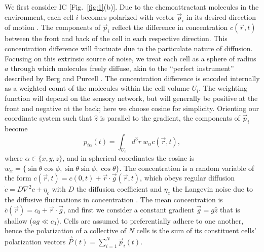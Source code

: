 We first consider IC [Fig.\ \ref{fig:1}(b)]. Due to the chemoattractant molecules in the environment, each cell $i$ becomes polarized with vector $\vec{p}_i$ in its desired direction of motion \cite{jilkine2011comparison}. The components of $\vec{p}_i$ reflect the difference in concentration $c(\vec{r},t)$ between the front and back of the cell in each respective direction. This concentration difference will fluctuate due to the particulate nature of diffusion. Focusing on this extrinsic source of noise, we treat each cell as a sphere of radius $a$ through which molecules freely diffuse, akin to the ``perfect instrument'' described by Berg and Purcell \cite{berg1977physics}.
The concentration difference is encoded internally as a weighted count of the molecules within the cell volume $U_i$. The weighting function will depend on the sensory network, but will generally be positive at the front and negative at the back; here we choose cosine for simplicity. Orienting our coordinate system such that $\hat{z}$ is parallel to the gradient, the components of $\vec{p}_i$ become
\begin{equation}
    p_{i\alpha}(t) = \int_{U_i} d^3r \ w_\alpha c(\vec{r},t) , \label{eq:ICcell}
\end{equation}
where $\alpha\in\{x,y,z\}$, and in spherical coordinates the cosine is $w_\alpha = \{\sin\theta \cos\phi, \sin\theta \sin\phi, \cos\theta\}$.
The concentration is a random variable of the form
$c(\vec{r},t) = c(0,t) + \vec{r}\cdot\vec{g}(\vec{r},t)$,
which obeys regular diffusion $\dot{c} = D\nabla^2c+\eta_c$ with $D$ the diffusion coefficient and $\eta_c$ the Langevin noise due to the diffusive fluctuations in concentration \cite{gardiner1985handbook,fancher2016fundamental}. The mean concentration is
$\bar{c}(\vec{r}) = c_0 + \vec{r}\cdot\vec{g}$,
and first we consider a constant gradient
$\vec{g} = g \hat{z}$ that is shallow ($ag \ll c_0$). Cells are assumed to preferentially adhere to one another, hence the polarization of a collective of $N$ cells is the sum of its constituent cells' polarization vectors $\vec{P}(t) = \sum_{i=1}^N \vec{p}_i(t)$.

